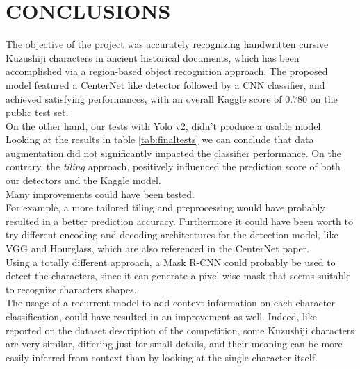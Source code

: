 \section{CONCLUSIONS}
\label{sec:conclusions}

The objective of the project was accurately recognizing handwritten cursive Kuzushiji characters in ancient historical documents, which has been accomplished via a region-based object recognition approach. The proposed model featured a CenterNet like detector followed by a CNN classifier, and achieved satisfying performances, with an overall Kaggle score of $0.780$ on the public test set.\\
On the other hand, our tests with Yolo v2, didn't produce a usable model.\\
Looking at the results in table \ref{tab:finaltests} we can conclude that data augmentation did not significantly impacted the classifier performance. On the contrary, the \textit{tiling} approach, positively influenced the prediction score of both our detectors and the Kaggle model. \\

Many improvements could have been tested.\\ For example, a more tailored tiling and preprocessing would have probably resulted in a better prediction accuracy. Furthermore it could have been worth to try different encoding and decoding architectures for the detection model, like VGG and Hourglass, which are also referenced in the CenterNet paper. \\
Using a totally different approach, a Mask R-CNN could probably be used to detect the characters, since it can generate a pixel-wise mask that seems suitable to recognize characters shapes.\\
The usage of a recurrent model to add context information on each character classification, could have resulted in an improvement as well. Indeed, like reported on the dataset description of the competition, some Kuzushiji characters are very similar, differing just for small details, and their meaning can be more easily inferred from context than by looking at the single character itself.
